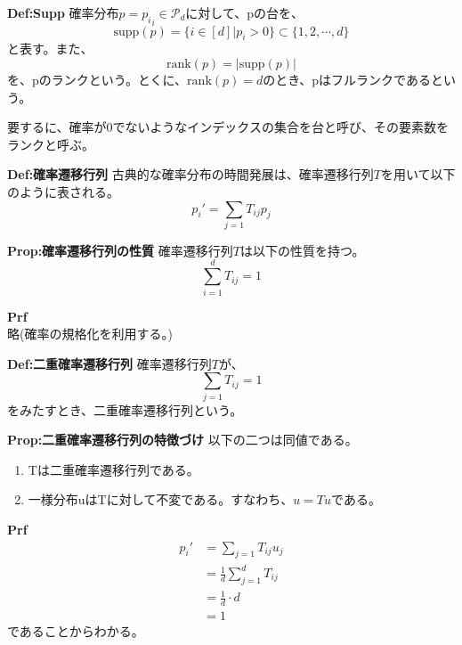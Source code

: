 \documentclass[a4paper,11pt]{jsarticle}
\numberwithin{equation}{section}
\begin{document}
\begin{itembox}[l]{\textbf{Def:Supp}}
    確率分布$p ={p_i}_i \in \mathcal{P}_d$に対して、pの台を、
    \begin{equation}
        \text{supp}(p) = \{i \in [d] | p_i > 0\} \subset \{1, 2, \cdots, d\}
    \end{equation}
    と表す。また、
    \begin{equation}
        \text{rank}(p) = |\text{supp}(p)|
    \end{equation}
    を、pのランクという。とくに、$\text{rank}(p) = d$のとき、pはフルランクであるという。
\end{itembox}
要するに、確率が0でないようなインデックスの集合を台と呼び、その要素数をランクと呼ぶ。\\

\begin{itembox}[l]{\textbf{Def:確率遷移行列}}
    古典的な確率分布の時間発展は、確率遷移行列$T$を用いて以下のように表される。
    \begin{equation}
        p_i ' = \sum_{j=1} T_{ij}p_j 
    \end{equation}
\end{itembox}

\begin{itembox}[l]{\textbf{Prop:確率遷移行列の性質}}
    確率遷移行列$T$は以下の性質を持つ。
    \begin{equation}
        \sum_{i=1}^{d}T_{ij} = 1
    \end{equation}
\end{itembox}
\textbf{Prf}\\
略(確率の規格化を利用する。)\hfill \qedsymbol\\

\begin{itembox}[l]{\textbf{Def:二重確率遷移行列}}
    確率遷移行列$T$が、
    \begin{equation}
        \sum_{j=1} T_{ij} = 1
    \end{equation}
    をみたすとき、二重確率遷移行列という。
\end{itembox}
\begin{itembox}[l]{\textbf{Prop:二重確率遷移行列の特徴づけ}}
    以下の二つは同値である。
    \begin{enumerate}
        \item Tは二重確率遷移行列である。
        \item 一様分布uはTに対して不変である。すなわち、$u=Tu$である。
    \end{enumerate}
\end{itembox}
\textbf{Prf}\\
\begin{align}
    p_i ' &= \sum_{j=1} T_{ij}u_j\\
    &= \frac{1}{d}\sum_{j=1}^{d}T_{ij}\\
    &= \frac{1}{d}\cdot d\\
    &= 1
\end{align}
であることからわかる。\\
\end{document}
